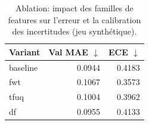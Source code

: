 \begin{table}[h]
\centering
\begin{tabular}{lrr}
\hline
Variant & Val MAE $\downarrow$ & ECE $\downarrow$ \\
\hline
baseline & 0.0944 & 0.4183 \\
fwt & 0.1067 & 0.3573 \\
tfuq & 0.1004 & 0.3962 \\
df & 0.0955 & 0.4133 \\
\hline
\end{tabular}
\caption{Ablation: impact des familles de features sur l'erreur et la calibration des incertitudes (jeu synthétique).}
\end{table}
